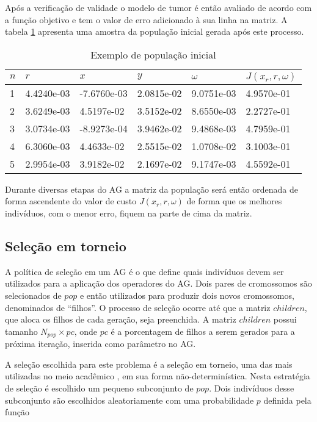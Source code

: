 Após a verificação de validade o modelo de tumor é então avaliado de acordo com a função objetivo e tem o valor de erro adicionado à sua linha na matriz. A tabela \ref{tab:initpop} apresenta uma amostra da população inicial gerada após este processo.

\begin{table}[!ht]
\centering
\begin{tabular}{llllll}
\hline $n$ & $r$ & $x$ & $y$ & $\omega$ & $J(x_r,r,\omega)$ \\ \hline
1&4.4240e-03 & -7.6760e-03 &  2.0815e-02  & 9.0751e-03 &  4.9570e-01 \\
2&3.6249e-03  & 4.5197e-02 &  3.5152e-02 &  8.6550e-03  & 2.2727e-01\\
3&3.0734e-03 & -8.9273e-04  & 3.9462e-02 &  9.4868e-03  & 4.7959e-01\\
4&6.3060e-03 &  4.4633e-02 &  2.5515e-02 &  1.0708e-02  & 3.1003e-01\\
5&2.9954e-03 &  3.9182e-02  & 2.1697e-02 &  9.1747e-03  & 4.5592e-01\\
\hline
\end{tabular}
\caption{Exemplo de população inicial}\label{tab:initpop}
\end{table}

Durante diversas etapas do AG a matriz da população será então ordenada de forma ascendente do valor de custo $J(x_r,r,\omega)$ de forma que os melhores indivíduos, com o menor erro, fiquem na parte de cima da matriz.

\subsection{Seleção em torneio}
A política de seleção em um AG é o que define quais indivíduos devem ser utilizados para a aplicação dos operadores do AG. Dois pares de cromossomos são selecionados de $pop$ e então utilizados para produzir dois novos cromossomos, denominados de ``filhos''. O processo de seleção ocorre até que a matriz $children$, que aloca os filhos de cada geração, seja preenchida. A matriz $children$ possui tamanho $N_{pop} \times pc$, onde $pc$ é a porcentagem de filhos a serem gerados para a próxima iteração, inserida como parâmetro no AG.

A seleção escolhida para este problema é a seleção em torneio, uma das mais utilizadas no meio acadêmico \cite{haupt2004practical}, em sua forma não-determinística. Nesta estratégia de seleção é escolhido um pequeno subconjunto de $pop$. Dois indivíduos desse subconjunto são escolhidos aleatoriamente com uma probabilidade $p$ definida pela função

